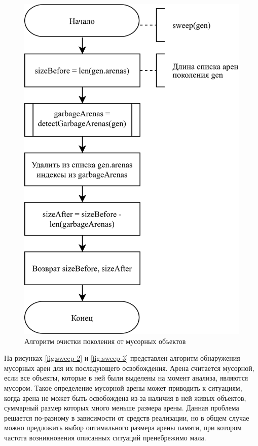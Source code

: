 \begin{figure}[H]
	\centering
	\includegraphics[scale=0.185]{assets/sweep-1.png}
	\caption{Алгоритм очистки поколения от мусорных объектов}
	\label{fig:sweep-1}
\end{figure}

На рисунках \ref{fig:sweep-2} и \ref{fig:sweep-3} представлен алгоритм обнаружения мусорных арен для их последующего освобождения. Арена считается мусорной, если все объекты, которые в ней были выделены на момент анализа, являются мусором. Такое определение мусорной арены может приводить к ситуациям, когда арена не может быть освобождена из-за наличия в ней живых объектов, суммарный размер которых много меньше размера арены. Данная проблема решается по-разному в зависимости от средств реализации, но в общем случае можно предложить выбор оптимального размера арены памяти, при котором частота возникновения описанных ситуаций пренебрежимо мала.

